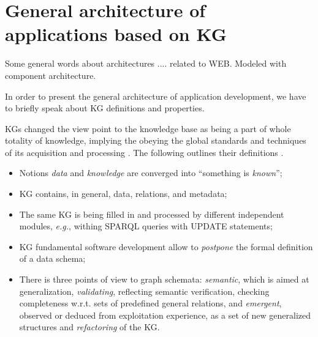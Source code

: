 \documentclass[
]{ceurart}
\begin{document}
\section{General architecture of applications based on KG}
\label{sec:architecture}

Some general words about architectures .... related to WEB.  Modeled with component architecture.

In order to present the general architecture of application development, we have to briefly speak about KG definitions and properties.


KGs changed the view point to the knowledge base as being a part of whole totality of knowledge, implying the obeying the global standards and techniques of its acquisition and processing \cite{hogan}.  The following outlines their definitions \cite{hogan}.
 \begin{itemize}
  \item Notions \emph{data} and \emph{knowledge} are converged into ``something is \emph{known}'';
  \item KG contains, in general, data, relations, and metadata;
  \item The same KG is being filled in and processed by different independent modules, \emph{e.g.}, withing SPARQL queries with UPDATE statements;
  \item KG fundamental software development allow to \emph{postpone} the formal definition of a data schema;
  \item There is three points of view to graph schemata: \emph{semantic}, which is aimed at generalization, \emph{validating}, reflecting semantic verification, checking completeness w.r.t. sets of predefined general relations, and \emph{emergent}, observed or deduced from exploitation experience, as a set of new generalized structures and \emph{refactoring} of the KG.
  \end{itemize}
\end{document}
